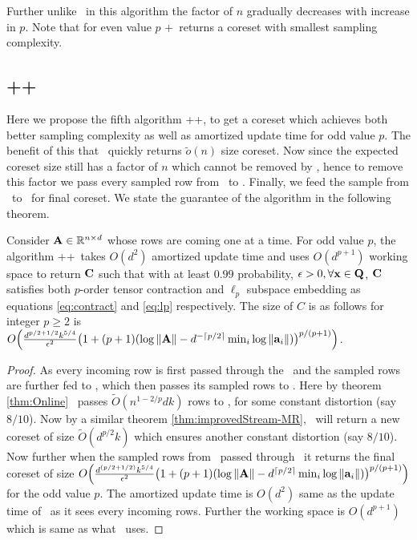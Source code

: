 Further unlike \online~in this algorithm the factor of $n$ gradually decreases with increase in $p$. Note that for even value $p$ \online+~returns a coreset with smallest sampling complexity.
% 
\subsection{\online+\mrlw+}
Here we propose the fifth algorithm \online+\mrlw+, to get a coreset which achieves both better sampling complexity as well as amortized update time for odd value $p$. The benefit of this that \online~quickly returns $\tilde{o}(n)$ size coreset. Now since the expected coreset size still has a factor of $n$ which cannot be removed by , hence to remove this factor we pass every sampled row from \online~to \mrlw. Finally, we feed the sample from \mrlw~to ~for final coreset. We state the guarantee of the algorithm in the following theorem.
\begin{theorem}{\label{thm:lflwkf}}
  Consider $\mathbf{A} \in \mathbb{R}^{n \times d}$ whose rows are coming one at a time. For odd value $p$, the algorithm \online+\mrlw+~takes $O(d^{2})$ amortized update time and uses $O(d^{p+1})$ working space to return $\mathbf{C}$ such that with at least $0.99$ probability, $\epsilon > 0, \forall \mathbf{x} \in \mathbf{Q}$, $\mathbf{C}$ satisfies both $p$-order tensor contraction and $\ell_{p}$ subspace embedding as equations \eqref{eq:contract} and \eqref{eq:lp} respectively. The size of $C$ is as follows for integer $p \ge 2$ is $O\Big(\frac{d^{p/2+1/2}k^{5/4}}{\epsilon^{2}}\big(1+(p+1)(\log \|\mathbf{A}\|-d^{-\lceil p/2 \rceil}\min_{i}\log \|\mathbf{a}_{i}\|)\big)^{p/(p+1)}\Big)$.
\end{theorem}
% 
\begin{proof}{\label{proof:lflwkf}}
 As every incoming row is first passed through the \online~and the sampled rows are further fed to \mrlw, which then passes its sampled rows to . Here by theorem \ref{thm:Online} \online~passes $\tilde{O}(n^{1-2/p}dk)$ rows to \mrlw, for some constant distortion (say $8/10$). Now by a similar theorem \ref{thm:improvedStream-MR}, \mrlw~will return a new coreset of size $\tilde{O}(d^{p/2}k)$ which ensures another constant distortion (say $8/10$). Now further when the sampled rows from \mrlw~passed through ~it returns the final coreset of size $O\Big(\frac{d^{(p/2+1/2)}k^{5/4}}{\epsilon^{2}}\big(1+(p+1)(\log \|\mathbf{A}\|-d^{\lceil p/2 \rceil}\min_{i}\log \|\mathbf{a}_{i}\|)\big)^{p/(p+1)}\Big)$ for the odd value $p$. The amortized update time is $O(d^2)$ same as the update time of \online~as it sees every incoming rows. Further the working space is $O(d^{p+1})$ which is same as what ~uses.
\end{proof}
% 
